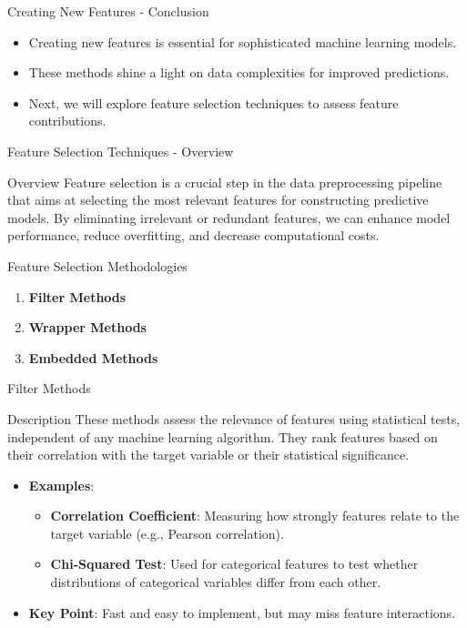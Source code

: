 \documentclass[aspectratio=169]{beamer}
\begin{document}
\begin{frame}[fragile]{Creating New Features - Conclusion}
    \begin{itemize}
        \item Creating new features is essential for sophisticated machine learning models.
        \item These methods shine a light on data complexities for improved predictions.
        \item Next, we will explore feature selection techniques to assess feature contributions.
    \end{itemize}
\end{frame}

\begin{frame}[fragile]{Feature Selection Techniques - Overview}
    \begin{block}{Overview}
        Feature selection is a crucial step in the data preprocessing pipeline that aims at selecting the most relevant features for constructing predictive models. 
        By eliminating irrelevant or redundant features, we can enhance model performance, reduce overfitting, and decrease computational costs.
    \end{block}
\end{frame}

\begin{frame}[fragile]{Feature Selection Methodologies}
    \begin{enumerate}
        \item \textbf{Filter Methods}
        \item \textbf{Wrapper Methods}
        \item \textbf{Embedded Methods}
    \end{enumerate}
\end{frame}

\begin{frame}[fragile]{Filter Methods}
    \begin{block}{Description}
        These methods assess the relevance of features using statistical tests, independent of any machine learning algorithm. 
        They rank features based on their correlation with the target variable or their statistical significance.
    \end{block}
    
    \begin{itemize}
        \item \textbf{Examples}:
            \begin{itemize}
                \item \textbf{Correlation Coefficient}: Measuring how strongly features relate to the target variable (e.g., Pearson correlation).
                \item \textbf{Chi-Squared Test}: Used for categorical features to test whether distributions of categorical variables differ from each other.
            \end{itemize}
        \item \textbf{Key Point}: Fast and easy to implement, but may miss feature interactions.
    \end{itemize}
\end{frame}
\end{document}

